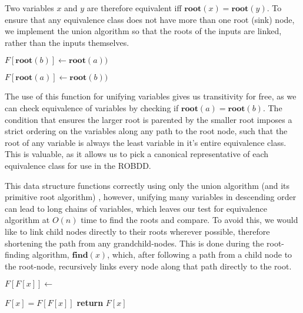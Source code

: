 \documentclass[11pt,table]{article}
\newcounter{r}
\begin{document}
Two variables $ x $ and $ y $ are therefore equivalent iff $ \textbf{root}(x)=\textbf{root}(y) $. To ensure that any equivalence class does not have more than one root (sink) node, we implement the union algorithm so that the roots of the inputs are linked, rather than the inputs themselves.


\begin{algorithm}
	\begin{algorithmic}[1]
		
		\State $ F[\textbf{root}(b)] \gets \textbf{root}(a)) $
		
		\State $ F[\textbf{root}(a)] \gets \textbf{root}(b)) $
		\EndIf
		
		\EndFunction
	\end{algorithmic}
\end{algorithm}

The use of this function for unifying variables gives us transitivity for free, as we can check equivalence of variables by checking if $ \textbf{root}(a) = \textbf{root}(b)$. The condition that ensures the larger root is parented by the smaller root imposes a strict ordering on the variables along any path to the root node, such that the root of any variable is always the least variable in it's entire equivalence class. This is valuable, as it allows us to pick a canonical representative of each equivalence class for use in the ROBDD.

This data structure functions correctly using only the union algorithm (and its primitive root algorithm) , however, unifying many variables in descending order can lead to long chains of variables, which leaves our test for equivalence algorithm at $ O(n) $ time to find the roots and compare. To avoid this, we would like to link child nodes directly to their roots wherever possible, therefore shortening the path from any grandchild-nodes. This is done during the root-finding algorithm, $ \textbf{find}(x) $, which, after following a path from a child node to the root-node, recursively links every node along that path directly to the root.

\begin{algorithm}
	\begin{algorithmic}[1]
		
		 
		\State $ F[F[x]] \gets $ {} 
		
		\EndIf
		
		\State $ F[x] = F[F[x]] $
		\State \textbf{return} $ F[x] $
		
		\EndFunction
	\end{algorithmic}
\end{algorithm}
\end{document}

